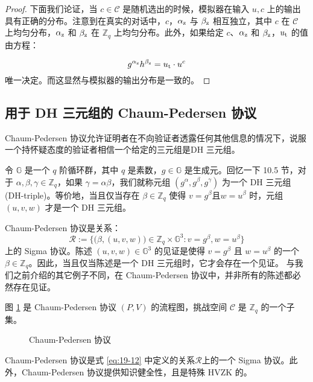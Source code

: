 \begin{proof}
下面我们论证，当 $c\in\mathcal{C}$ 是随机选出的时候，模拟器在输入 $u,c$ 上的输出具有正确的分布。注意到在真实的对话中，$c$，$\alpha_{\rm z}$ 与 $\beta_{\rm z}$ 相互独立，其中 $c$ 在 $\mathcal{C}$ 上均匀分布，$\alpha_{\rm z}$ 和 $\beta_{\rm z}$ 在 $\mathbb{Z}_q$ 上均匀分布。此外，如果给定 $c$、$\alpha_{\rm z}$ 和 $\beta_{\rm z}$，$u_{\rm t}$ 的值由方程：

$$
g^{\alpha_{\rm z}}h^{\beta_{\rm z}}=u_{\rm t}\cdot u^c
$$
唯一决定。而这显然与模拟器的输出分布是一致的。
\end{proof}

\subsection{用于 DH 三元组的 Chaum-Pedersen 协议}\label{subsec:19-5-2}

Chaum-Pedersen 协议允许证明者在不向验证者透露任何其他信息的情况下，说服一个持怀疑态度的验证者相信一个给定的三元组是DH 三元组。

令 $\mathbb{G}$ 是一个 $q$ 阶循环群，其中 $q$ 是素数，$g\in\mathbb{G}$ 是生成元。回忆一下 10.5 节，对于 $\alpha,\beta,\gamma\in\mathbb{Z}_q$，如果 $\gamma=\alpha\beta$，我们就称元组 $(g^\alpha,g^\beta,g^\gamma)$ 为一个 DH 三元组 (DH-triple)。等价地，当且仅当存在 $\beta\in\mathbb{Z}_q$ 使得 $v=g^\beta$且$w=u^\beta$ 时，元组 $(u,v,w)$ 才是一个 DH 三元组。

Chaum-Pedersen 协议是关系：
\begin{equation}\label{eq:19-12}
\mathcal{R}:=\bigg\lbrace
\big(\beta, (u,v,w)\big)\in\mathbb{Z}_q\times\mathbb{G}^3:v=g^\beta, w=u^\beta
\bigg\rbrace
\end{equation}
上的 Sigma 协议。陈述 $(u,v,w)\in\mathbb{G}^3$ 的见证是使得 $v=g^\beta$ 且 $w=u^\beta$ 的一个 $\beta\in\mathbb{Z}_q$。因此，当且仅当陈述是一个 DH 三元组时，它才会存在一个见证。 与我们之前介绍的其它例子不同，在 Chaum-Pedersen 协议中，并非所有的陈述都必然存在见证。 

图 \ref{fig:19-7} 是 Chaum-Pedersen 协议 $(P,V)$ 的流程图，挑战空间 $\mathcal{C}$ 是 $\mathbb{Z}_q$ 的一个子集。

\begin{figure}
  \centering
  
  \caption{Chaum-Pedersen 协议}
  \label{fig:19-7}
\end{figure}

\begin{theorem}
Chaum-Pedersen 协议是式 \ref{eq:19-12} 中定义的关系$\mathcal R$上的一个 Sigma 协议。此外，Chaum-Pedersen 协议提供知识健全性，且是特殊 HVZK 的。
\end{theorem}

